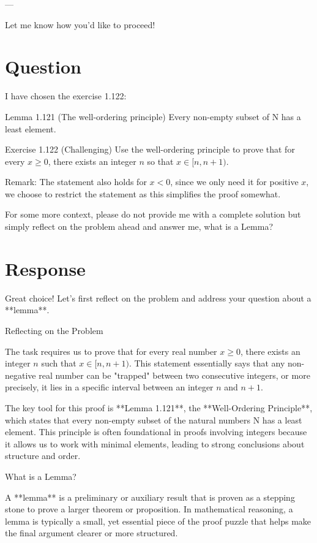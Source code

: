 \documentclass{article}
\begin{document}
---

Let me know how you'd like to proceed!

\section*{Question}

I have chosen the exercise 1.122: 

Lemma 1.121 (The well-ordering principle) Every non-empty subset of N has a least element.

Exercise 1.122 (Challenging) Use the well-ordering principle to prove that for every \( x \geq 0 \), there exists an integer \( n \) so that \( x \in [n,n + 1) \).

Remark: The statement also holds for \( x < 0 \), since we only need it for positive \( x \), we choose to restrict the statement as this simplifies the proof somewhat.

For some more context, please do not provide me with a complete solution but simply reflect on the problem ahead and answer me, what is a Lemma?

\section*{Response}

Great choice! Let's first reflect on the problem and address your question about a **lemma**.

Reflecting on the Problem

The task requires us to prove that for every real number \( x \geq 0 \), there exists an integer \( n \) such that \( x \in [n, n+1) \). This statement essentially says that any non-negative real number can be "trapped" between two consecutive integers, or more precisely, it lies in a specific interval between an integer \( n \) and \( n+1 \).

The key tool for this proof is **Lemma 1.121**, the **Well-Ordering Principle**, which states that every non-empty subset of the natural numbers N has a least element. This principle is often foundational in proofs involving integers because it allows us to work with minimal elements, leading to strong conclusions about structure and order.

What is a Lemma?

A **lemma** is a preliminary or auxiliary result that is proven as a stepping stone to prove a larger theorem or proposition. In mathematical reasoning, a lemma is typically a small, yet essential piece of the proof puzzle that helps make the final argument clearer or more structured.
\end{document}

